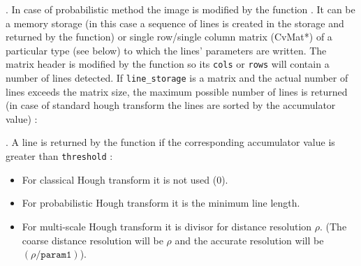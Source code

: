 \begin{description}
. In case of probabilistic method the image is modified by the function
. It can
be a memory storage (in this case a sequence of lines is created in
the storage and returned by the function) or single row/single column
matrix (CvMat*) of a particular type (see below) to which the lines'
parameters are written. The matrix header is modified by the function
so its \texttt{cols} or \texttt{rows} will contain a number of lines
detected. If \texttt{line\_storage} is a matrix and the actual number
of lines exceeds the matrix size, the maximum possible number of lines
is returned (in case of standard hough transform the lines are sorted
by the accumulator value)
:
\begin{description}
\end{description}
. A line is returned by the function if the corresponding accumulator value is greater than \texttt{threshold}
:
\begin{itemize}
  \item For classical Hough transform it is not used (0).
  \item For probabilistic Hough transform it is the minimum line length.
  \item For multi-scale Hough transform it is divisor for distance resolution $\rho$. (The coarse distance resolution will be $\rho$ and the accurate resolution will be $(\rho / \texttt{param1})$).

\end{itemize}
\end{description}
